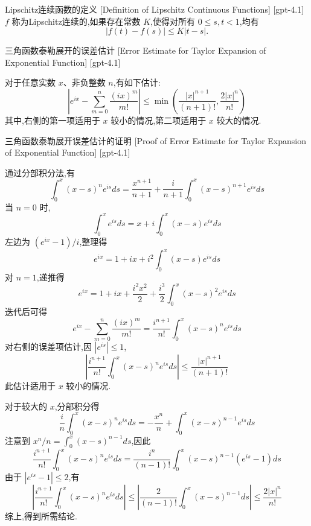\documentclass[UTF8]{ctexart}
\begin{document}
    \begin{dfn}
        {Lipschitz连续函数的定义}
        [Definition of Lipschitz Continuous Functions]
        [gpt-4.1]
        $f$ 称为Lipschitz连续的,如果存在常数 $K$,使得对所有 $0 \leq s, t < 1$,均有
\[
| f ( t ) - f ( s ) | \leq K | t - s |.
\]
    \end{dfn}
    
    
    
    \begin{lma}
        {三角函数泰勒展开的误差估计}
        [Error Estimate for Taylor Expansion of Exponential Function]
        [gpt-4.1]
        
对于任意实数 $x$、非负整数 $n$,有如下估计:
\[
\left| e^{ix} - \sum_{m=0}^n \frac{(ix)^m}{m!} \right| \leq \min\left( \frac{|x|^{n+1}}{(n+1)!}, \frac{2|x|^n}{n!} \right)
\]
其中,右侧的第一项适用于 $x$ 较小的情况,第二项适用于 $x$ 较大的情况.

    \end{lma}
    
    
    
    \begin{prf}
        {三角函数泰勒展开误差估计的证明}
        [Proof of Error Estimate for Taylor Expansion of Exponential Function]
        [gpt-4.1]
        
通过分部积分法,有
\[
\int_0^x (x-s)^n e^{is} ds = \frac{x^{n+1}}{n+1} + \frac{i}{n+1} \int_0^x (x-s)^{n+1} e^{is} ds
\]
当 $n = 0$ 时,
\[
\int_0^x e^{is} ds = x + i \int_0^x (x-s) e^{is} ds
\]
左边为 $(e^{ix} - 1)/i$,整理得
\[
e^{ix} = 1 + ix + i^2 \int_0^x (x-s) e^{is} ds
\]
对 $n = 1$,递推得
\[
e^{ix} = 1 + ix + \frac{i^2 x^2}{2} + \frac{i^3}{2} \int_0^x (x-s)^2 e^{is} ds
\]
迭代后可得
\[
e^{ix} - \sum_{m=0}^n \frac{(ix)^m}{m!} = \frac{i^{n+1}}{n!} \int_0^x (x-s)^n e^{is} ds
\]
对右侧的误差项估计,因 $|e^{is}| \leq 1$,
\[
\left| \frac{i^{n+1}}{n!} \int_0^x (x-s)^n e^{is} ds \right| \leq \frac{|x|^{n+1}}{(n+1)!}
\]
此估计适用于 $x$ 较小的情况.

对于较大的 $x$,分部积分得
\[
\frac{i}{n} \int_0^x (x-s)^n e^{is} ds = -\frac{x^n}{n} + \int_0^x (x-s)^{n-1} e^{is} ds
\]
注意到 $x^n/n = \int_0^x (x-s)^{n-1} ds$,因此
\[
\frac{i^{n+1}}{n!} \int_0^x (x-s)^n e^{is} ds = \frac{i^n}{(n-1)!} \int_0^x (x-s)^{n-1} (e^{is} - 1) ds
\]
由于 $|e^{is} - 1| \leq 2$,有
\[
\left| \frac{i^{n+1}}{n!} \int_0^x (x-s)^n e^{is} ds \right| \leq \left| \frac{2}{(n-1)!} \int_0^x (x-s)^{n-1} ds \right| \leq \frac{2|x|^n}{n!}
\]
综上,得到所需结论.

    \end{prf}
    
\end{document}

